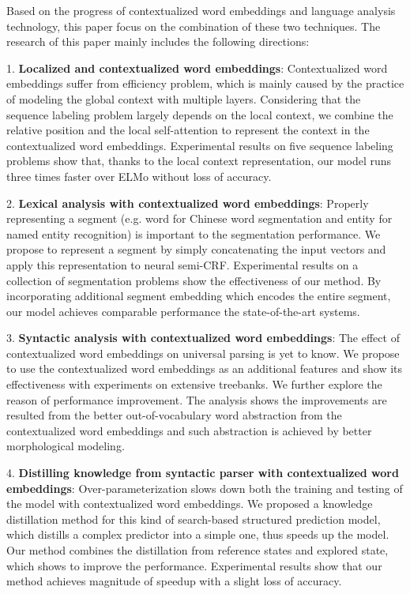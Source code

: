 \begin{eabstract}
Based on the progress of contextualized word embeddings and language analysis technology, 
this paper focus on the combination of these two techniques.
The research of this paper mainly includes the following directions:

1. \textbf{Localized and contextualized word embeddings}:
Contextualized word embeddings suffer from efficiency problem,
which is mainly caused by the practice of modeling the global context
with multiple layers.
Considering that the sequence labeling problem largely depends on
the local context, we combine the relative position and the local self-attention
to represent the context in the contextualized word embeddings.
Experimental results on five sequence labeling problems show that,
thanks to the local context representation,
our model runs three times faster over ELMo without loss of accuracy.

2. \textbf{Lexical analysis with contextualized word embeddings}:
Properly representing a segment (e.g. word for Chinese word segmentation and entity for named entity recognition)
is important to the segmentation performance.
We propose to represent a segment by simply concatenating the input vectors
and apply this representation to neural semi-CRF.
Experimental results on a collection of segmentation problems
show the effectiveness of our method.
By incorporating additional segment embedding which encodes the entire segment,
our model achieves comparable performance the state-of-the-art systems.

3. \textbf{Syntactic analysis with contextualized word embeddings}:
The effect of contextualized word embeddings on universal parsing is yet to know.
We propose to use the contextualized word embeddings as an additional features
and show its effectiveness with experiments on extensive treebanks.
We further explore the reason of performance improvement.
The analysis shows the improvements
are resulted from the better out-of-vocabulary word abstraction from
the contextualized word embeddings
and such abstraction is achieved by better morphological modeling.

4. \textbf{Distilling knowledge from syntactic parser with contextualized word embeddings}:
Over-parameterization slows down both the training and testing of the model with contextualized word embeddings.
We proposed a knowledge distillation method for this kind of search-based structured prediction model,
which distills a complex predictor into a simple one, thus speeds up the model.
Our method combines the distillation from reference states and explored state, which shows to
improve the performance.
Experimental results show that our method achieves magnitude of speedup with a slight loss of accuracy.


\end{eabstract}
